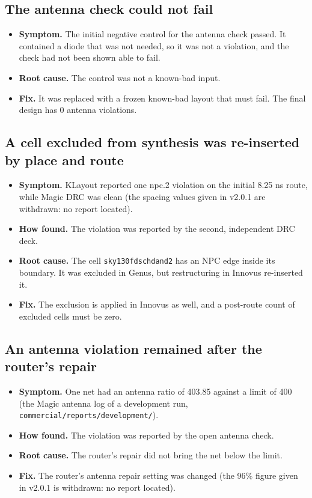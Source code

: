 \documentclass[11pt,letterpaper]{article}
\newcommand{\sk}[1]{\texttt{#1}}
\renewcommand{\_}{\textunderscore\penalty0\hskip0pt\relax}
\begin{document}
\subsection{The antenna check could not fail}
\begin{itemize}
\item \textbf{Symptom.} The initial negative control for the antenna check passed. It contained a diode that was not needed, so it was not a violation, and the check had not been shown able to fail.
\item \textbf{Root cause.} The control was not a known-bad input.
\item \textbf{Fix.} It was replaced with a frozen known-bad layout that must fail. The final design has 0 antenna violations.
\end{itemize}

\subsection{A cell excluded from synthesis was re-inserted by place and route}
\begin{itemize}
\item \textbf{Symptom.} KLayout reported one npc.2 violation on the initial 8.25 ns route, while Magic DRC was clean (the spacing values given in v2.0.1 are withdrawn: no report located).
\item \textbf{How found.} The violation was reported by the second, independent DRC deck.
\item \textbf{Root cause.} The cell \sk{sky130\_fd\_sc\_hd\_\_and2\_0} has an NPC edge inside its boundary. It was excluded in Genus, but restructuring in Innovus re-inserted it.
\item \textbf{Fix.} The exclusion is applied in Innovus as well, and a post-route count of excluded cells must be zero.
\end{itemize}

\subsection{An antenna violation remained after the router's repair}
\begin{itemize}
\item \textbf{Symptom.} One net had an antenna ratio of 403.85 against a limit of 400 (the Magic antenna log of a development run, \sk{commercial/reports/development/}).
\item \textbf{How found.} The violation was reported by the open antenna check.
\item \textbf{Root cause.} The router's repair did not bring the net below the limit.
\item \textbf{Fix.} The router's antenna repair setting was changed (the 96\% figure given in v2.0.1 is withdrawn: no report located).
\end{itemize}
\end{document}
